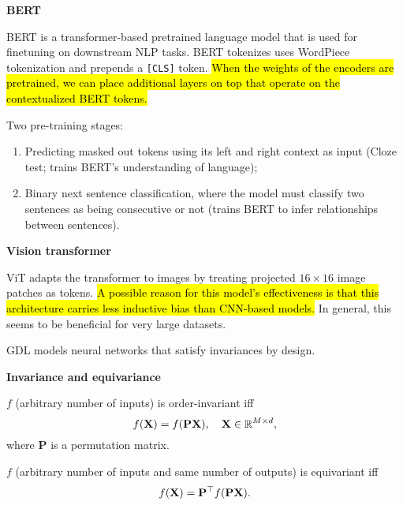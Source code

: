 \documentclass[10pt]{article}
\newenvironment{topic}[1]
{\textbf{\sffamily \footnotesize \colorbox{black}{\rlap{\textbf{\textcolor{white}{#1}}}\hspace{\linewidth}\hspace{-2\fboxsep}}}}
{}
\newenvironment{subtopic}[1]
{\begin{center}\textbf{\footnotesize \sffamily #1}\end{center}}
{}
\renewcommand{\mat}[1]{\ensuremath{\mathbf{#1}}}
\begin{document}
\begin{multicols*}{3}
\begin{topic}{Transformers}
        \begin{subtopic}{BERT}
            BERT is a transformer-based pretrained language model that is used for finetuning on
            downstream NLP tasks. BERT tokenizes uses WordPiece tokenization and prepends a
            \texttt{[CLS]} token. \hl{When the weights of the encoders are pretrained, we can place
            additional layers on top that operate on the contextualized BERT tokens.}

            Two pre-training stages:
            \begin{enumerate}[left=0pt]
                \item Predicting masked out tokens using its left and right context as input (Cloze test; trains BERT's
                      understanding of language);
                \item Binary next sentence classification, where the model must classify two sentences as being
                      consecutive or not (trains BERT to infer relationships between sentences).
            \end{enumerate}
        \end{subtopic}

        \begin{subtopic}{Vision transformer}
            ViT adapts the transformer to images by treating projected $16 \times 16$ image patches
            as tokens. \hl{A possible reason for this model's effectiveness is that this architecture
            carries less inductive bias than CNN-based models.} In general, this seems to be beneficial
            for very large datasets.
        \end{subtopic}

    \end{topic}

    \begin{topic}{Geometric deep learning}
        GDL models neural networks that satisfy invariances by design.

        \begin{subtopic}{Invariance and equivariance}
            $f$ (arbitrary number of inputs) is order-invariant iff \[
                f(\mat{X}) = f(\mat{P}\mat{X}), \quad \mat{X} \in \R^{M \times d},
            \]
            where $\mat{P}$ is a permutation matrix.

            $f$ (arbitrary number of inputs and same number of outputs) is equivariant iff \[
                f(\mat{X}) = \transpose{\mat{P}} f(\mat{P} \mat{X}).
            \]


\end{subtopic}
\end{topic}
\end{multicols*}
\end{document}
